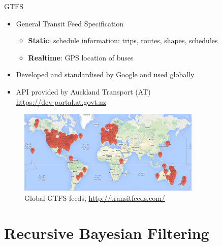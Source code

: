 \documentclass[10pt,t]{beamer}
\begin{document}
\begin{frame}{GTFS}

  \begin{itemize}[<+->]
    \item General Transit Feed Specification
      \begin{itemize}
      \item \textbf{Static}: schedule information: trips, routes, shapes,
        schedules
      \item \textbf{Realtime}: GPS location of buses
      \end{itemize}

    \item Developed and standardised by Google and used globally
    \item API provided by Auckland Transport (AT)\\
      \url{https://dev-portal.at.govt.nz}
  \end{itemize}

  \begin{overprint}
    \begin{figure}
      \vspace{-3em}
      \centering
      \includegraphics[height=4cm]{gtfs-feeds.png}
      \caption{Global GTFS feeds, \url{http://transitfeeds.com/}}
    \end{figure}
  \end{overprint}

\end{frame}





\section{Recursive Bayesian Filtering}
\end{document}
